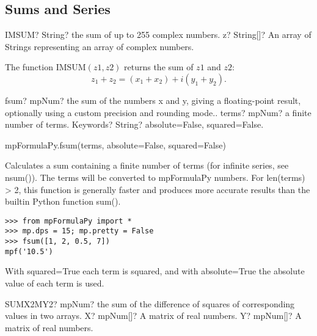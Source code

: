 \subsection{Sums and Series} 


\vspace{0.6cm}
\begin{mpFunctionsExtract}
	\mpWorksheetFunctionOneNotImplemented
	{IMSUM? String? the sum of up to 255 complex numbers.}
	{z? String[]? An array of Strings representing an array of complex numbers.}
\end{mpFunctionsExtract}

\vspace{0.3cm}
The function \textsf{IMSUM$(z1, z2)$} returns the sum of $z1$ and $z2$: 
\begin{equation}
	z_1 + z_2 =(x_1 + x_2) + i(y_1 + y_2).
\end{equation}



\vspace{0.3cm}
\begin{mpFunctionsExtract}
	\mpFunctionTwo
	{fsum? mpNum? the sum of the numbers x and y, giving a floating-point result, optionally using a custom precision and rounding mode..}
	{terms? mpNum? a finite number of terms.}
	{Keywords? String? absolute=False, squared=False.}	
\end{mpFunctionsExtract}

\vspace{0.3cm}

mpFormulaPy.fsum(terms, absolute=False, squared=False)

\vpara
Calculates a sum containing a finite number of terms (for infinite series, see nsum()). The terms will be converted to mpFormulaPy numbers. For len(terms) > 2, this function is generally faster and produces more accurate results than the builtin Python function sum().

\begin{lstlisting}
>>> from mpFormulaPy import *
>>> mp.dps = 15; mp.pretty = False
>>> fsum([1, 2, 0.5, 7])
mpf('10.5')
\end{lstlisting}

With squared=True each term is squared, and with absolute=True the absolute value of each term is used.



\begin{mpFunctionsExtract}
	\mpWorksheetFunctionTwoNotImplemented
	{SUMX2MY2? mpNum? the sum of the difference of squares of corresponding values in two arrays.}
	{X? mpNum[]? A matrix of real numbers.}
	{Y? mpNum[]? A matrix of real numbers.}
\end{mpFunctionsExtract}

